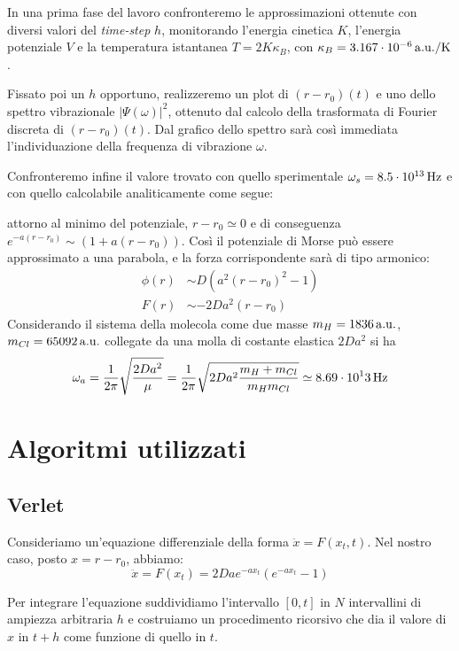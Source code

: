 \documentclass[italian,a4paper]{article}
\newcommand{\w}{\omega}
\newcommand{\f}{\phi}
\begin{document}
In una prima fase del lavoro confronteremo le approssimazioni ottenute con diversi valori del \textit{time-step} $h$, monitorando l'energia cinetica $K$, l'energia potenziale $V$ e la temperatura istantanea $T=2K \kappa_B$, con $\kappa_B=\unit[3.167 \cdot 10^{-6}]{a.u./K}$.

Fissato poi un $h$ opportuno, realizzeremo un plot di $(r-r_0)(t)$ e uno
dello spettro vibrazionale $|\Psi(\omega)|^2$, ottenuto dal calcolo della
trasformata di Fourier discreta di $(r-r_0)(t)$. Dal grafico dello spettro
sar\`a cos\`i immediata l'individuazione della frequenza di vibrazione
$\omega$.

Confronteremo infine il valore trovato con quello sperimentale $\w_s=\unit[8.5\cdot 10^{13}]{Hz}$ e con quello calcolabile analiticamente come segue:

attorno al minimo del potenziale, $r-r_0\simeq0$ e di conseguenza $e^{-a(r-r_0)}\sim(1+a(r-r_0))$. Cos\`i il potenziale di Morse pu\`o essere approssimato a una parabola, e la forza corrispondente sar\`a di tipo armonico:
\begin{align*}
\f(r)&\sim D \left(a^2(r-r_0)^2-1\right)\\
F(r)&\sim -2 D a^2 (r-r_0)
\end{align*}
Considerando il sistema della molecola come due masse $m_H=\unit[1836]{a.u.}$, $m_{Cl}=\unit[65092]{a.u.}$ collegate da una molla di costante elastica $2Da^2$ si ha
\begin{equation*}
\w_a=\dfrac{1}{2\pi}\sqrt{\dfrac{2Da^2}{\mu}}=\dfrac{1}{2\pi}\sqrt{2Da^2 \dfrac{m_H + m_{Cl}}{m_H m_{Cl}}}\simeq \unit[8.69 \cdot 10^13]{Hz}
\end{equation*}


\section{Algoritmi utilizzati}
\subsection*{Verlet}
Consideriamo un'equazione differenziale della forma $\ddot{x}=F(x_t,t)$. Nel nostro caso, posto $x=r-r_0$, abbiamo:
\begin{equation*}
 \ddot{x}=F(x_t)= 2Da e^{-ax_t}\left(e^{-ax_t}-1\right)
\end{equation*}

Per integrare l'equazione suddividiamo l'intervallo $[0,t]$ in $N$ intervallini di ampiezza arbitraria $h$ e costruiamo un procedimento ricorsivo che dia il valore di $x$ in $t+h$ come funzione di quello in $t$.
\end{document}
